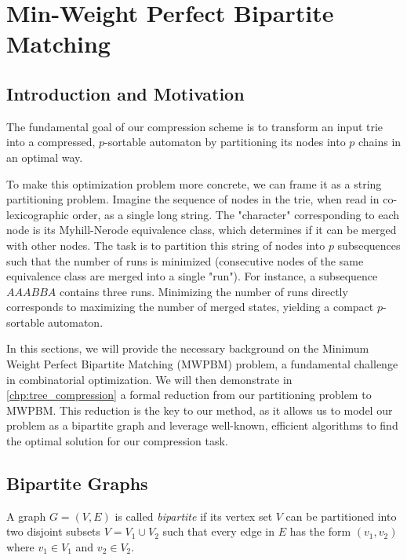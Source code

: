 \section{Min-Weight Perfect Bipartite Matching} \label{chp:min_weight_perfect_bipartite_matching}

\subsection{Introduction and Motivation}
The fundamental goal of our compression scheme is to transform an input trie into a compressed, $p$-sortable automaton by partitioning its nodes into $p$ chains in an optimal way.

To make this optimization problem more concrete, we can frame it as a string partitioning problem. Imagine the sequence of nodes in the trie, when read in co-lexicographic order, as a single long string. The "character" corresponding to each node is its Myhill-Nerode equivalence class, which determines if it can be merged with other nodes. The task is to partition this string of nodes into $p$ subsequences such that the number of runs is minimized (consecutive nodes of the same equivalence class are merged into a single "run"). For instance, a subsequence $AAABBA$ contains three runs. Minimizing the number of runs directly corresponds to maximizing the number of merged states, yielding a compact $p$-sortable automaton.

In this sections, we will provide the necessary background on the Minimum Weight Perfect Bipartite Matching (MWPBM) problem, a fundamental challenge in combinatorial optimization. We will then demonstrate in \cref{chp:tree_compression} a formal reduction from our partitioning problem to MWPBM. This reduction is the key to our method, as it allows us to model our problem as a bipartite graph and leverage well-known, efficient algorithms to find the optimal solution for our compression task.

\subsection{Bipartite Graphs} 
\begin{definition} \label{def:bipartite}
    A graph $G=(V,E)$ is called \textit{bipartite} if its vertex set $V$ can be partitioned into two disjoint subsets $V=V_1 \cup V_2$ such that every edge in $E$ has the form $(v_1,v_2)$ where $v_1\in V_1$ and $v_2 \in V_2$.
\end{definition} 

